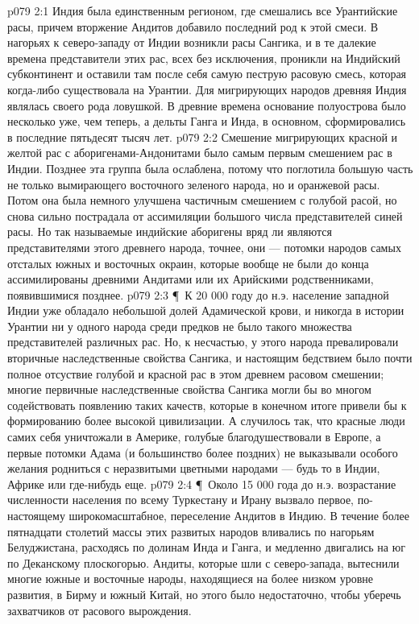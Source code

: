 \vs p079 2:1 Индия была единственным регионом, где смешались все Урантийские расы, причем вторжение Андитов добавило последний род к этой смеси. В нагорьях к северо\hyp{}западу от Индии возникли расы Сангика, и в те далекие времена представители этих рас, всех без исключения, проникли на Индийский субконтинент и оставили там после себя самую пеструю расовую смесь, которая когда\hyp{}либо существовала на Урантии. Для мигрирующих народов древняя Индия являлась своего рода ловушкой. В древние времена основание полуострова было несколько уже, чем теперь, а дельты Ганга и Инда, в основном, сформировались в последние пятьдесят тысяч лет.
\vs p079 2:2 Смешение мигрирующих красной и желтой рас с аборигенами\hyp{}Андонитами было самым первым смешением рас в Индии. Позднее эта группа была ослаблена, потому что поглотила большую часть не только вымирающего восточного зеленого народа, но и оранжевой расы. Потом она была немного улучшена частичным смешением с голубой расой, но снова сильно пострадала от ассимиляции большого числа представителей синей расы. Но так называемые индийские аборигены вряд ли являются представителями этого древнего народа, точнее, они --- потомки народов самых отсталых южных и восточных окраин, которые вообще не были до конца ассимилированы древними Андитами или их Арийскими родственниками, появившимися позднее.
\vs p079 2:3 \P\ К 20 000 году до н.э. население западной Индии уже обладало небольшой долей Адамической крови, и никогда в истории Урантии ни у одного народа среди предков не было такого множества представителей различных рас. Но, к несчастью, у этого народа превалировали вторичные наследственные свойства Сангика, и настоящим бедствием было почти полное отсуствие голубой и красной рас в этом древнем расовом смешении; многие первичные наследственные свойства Сангика могли бы во многом содействовать появлению таких качеств, которые в конечном итоге привели бы к формированию более высокой цивилизации. А случилось так, что красные люди самих себя уничтожали в Америке, голубые благодушествовали в Европе, а первые потомки Адама (и большинство более поздних) не выказывали особого желания родниться с неразвитыми цветными народами --- будь то в Индии, Африке или где\hyp{}нибудь еще.
\vs p079 2:4 \P\ Около 15 000 года до н.э. возрастание численности населения по всему Туркестану и Ирану вызвало первое, по\hyp{}настоящему широкомасштабное, переселение Андитов в Индию. В течение более пятнадцати столетий массы этих развитых народов вливались по нагорьям Белуджистана, расходясь по долинам Инда и Ганга, и медленно двигались на юг по Деканскому плоскогорью. Андиты, которые шли с северо\hyp{}запада, вытеснили многие южные и восточные народы, находящиеся на более низком уровне развития, в Бирму и южный Китай, но этого было недостаточно, чтобы уберечь захватчиков от расового вырождения.
